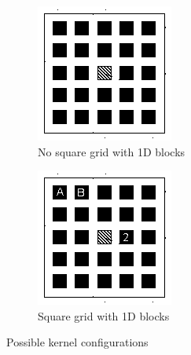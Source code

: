 \documentclass[a4paper]{article}
\begin{document}
\begin{figure}[!ht]
\begin{subfigure}{0.5\textwidth}
\centering
\includegraphics[width=\linewidth]{filter}
\caption{No square grid with 1D blocks}
\label{fig:ns1}
\end{subfigure} %
\begin{subfigure}{0.5\textwidth}
\centering
\includegraphics[width=\linewidth]{filter_letters}
\caption{Square grid with 1D blocks}
\label{fig:s1}
\end{subfigure}
\caption{Possible kernel configurations}
 \label{fig:speed}
\end{figure}
\FloatBarrier
\end{document}
